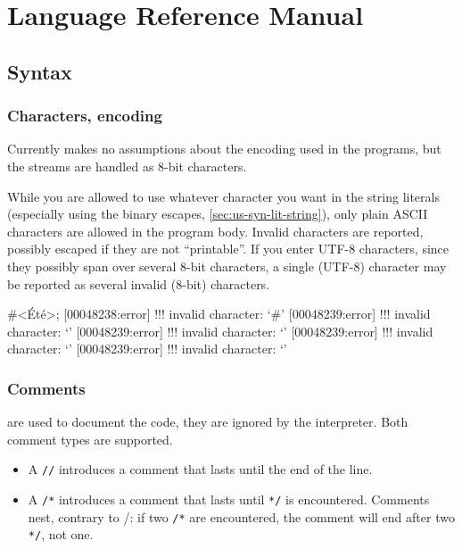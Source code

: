\chapter{\us Language Reference Manual}
\label{sec:lang}

\section{Syntax}

\subsection{Characters, encoding}

Currently \us makes no assumptions about the encoding used in the
programs, but the streams are handled as 8-bit characters.

While you are allowed to use whatever character you want in the string
literals (especially using the binary escapes,
\autoref{sec:us-syn-lit-string}), only plain ASCII characters are
allowed in the program body.  Invalid characters are reported,
possibly escaped if they are not ``printable''.  If you enter UTF-8
characters, since they possibly span over several 8-bit characters, a
single (UTF-8) character may be reported as several invalid (8-bit)
characters.

\begin{urbiscript}[firstnumber=1,escapeinside=<>]
#<Été>;
[00048238:error] !!! invalid character: `#'
[00048239:error] !!! invalid character: `'
[00048239:error] !!! invalid character: `'
[00048239:error] !!! invalid character: `'
[00048239:error] !!! invalid character: `'
\end{urbiscript}

\subsection{Comments}

 are used to document the code, they are ignored by the
\us interpreter. Both \Cxx comment types are supported.

\begin{itemize}
\item A \lstinline|//| introduces a comment that lasts until the end
  of the line.
\item A \lstinline|/*| introduces a comment that lasts until
  \lstinline|*/| is encountered. Comments nest, contrary to \C/\Cxx:
  if two \lstinline|/*| are encountered, the
  comment will end after two \lstinline|*/|, not one.
\end{itemize}

